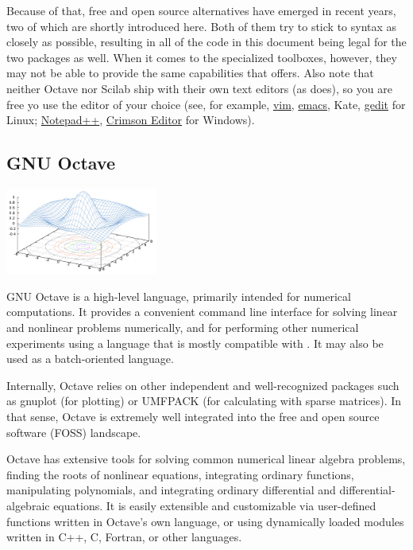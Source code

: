 Because of that, free and open source {\matlab} alternatives have emerged in recent years, two of which are shortly introduced here. Both of them try to stick to {\matlab} syntax as closely as possible, resulting in all of the code in this document being legal for the two packages as well. When it comes to the specialized toolboxes, however, they may not be able to provide the same capabilities that {\matlab} offers. Also note that neither Octave nor Scilab ship with their own text editors (as {\matlab} does), so you are free yo use the editor of your choice (see, for example, \href{http://www.vim.org/}{vim}, \href{http://www.gnu.org/software/emacs/}{emacs}, Kate, \href{http://projects.gnome.org/gedit/}{gedit} for Linux; \href{http://notepad-plus.sourceforge.net/uk/site.htm}{Notepad++}, \href{http://www.crimsoneditor.com/}{Crimson Editor} for Windows).

\subsection{GNU Octave}

\begin{floatingfigure}[r]{5cm}
\centering
\includegraphics[width=5cm]{figures/Octave_Sombrero}
\end{floatingfigure}

GNU Octave is a high-level language, primarily intended for numerical computations. It provides a convenient command line interface for solving linear and nonlinear problems numerically, and for performing other numerical experiments using a language that is mostly compatible with {\matlab}. It may also be used as a batch-oriented language.

Internally, Octave relies on other independent and well-recognized packages such as gnuplot (for plotting) or UMFPACK (for calculating with sparse matrices). In that sense, Octave is extremely well integrated into the free and open source software (FOSS) landscape.

Octave has extensive tools for solving common numerical linear algebra problems, finding the roots of nonlinear equations, integrating ordinary functions, manipulating polynomials, and integrating ordinary differential and differential-algebraic equations. It is easily extensible and customizable via user-defined functions written in Octave's own language, or using dynamically loaded modules written in C++, C, Fortran, or other languages.

